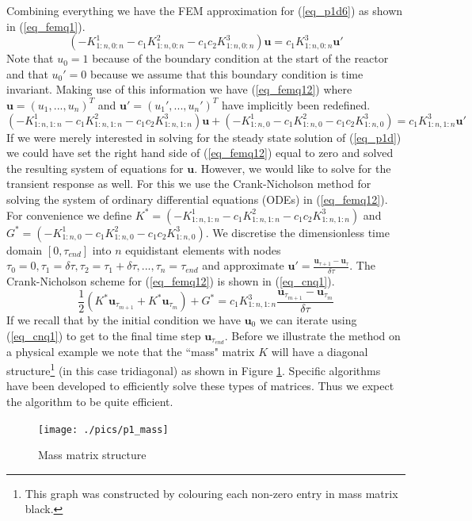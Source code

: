 \documentclass[11pt,fleqn]{article}
\theoremstyle{defstyle}
\begin{document}
Combining everything we have the FEM approximation for (\ref{eq_p1d6}) as shown in (\ref{eq_femq1}). 
\begin{equation}
\left(-K^1_{1:n,0:n}-c_1K^2_{1:n,0:n}-c_1c_2K^3_{1:n,0:n} \right)\mathbf{u} =  c_1K^3_{1:n,0:n}\mathbf{u}\prime
\label{eq_femq1}
\end{equation}
Note that $u_0=1$ because of the boundary condition at the start of the reactor and that $u_0\prime=0$ because we assume that this boundary condition is time invariant. Making use of this information we have (\ref{eq_femq12}) where $\mathbf{u}=\left(u_1,...,u_n\right)^T$ and $\mathbf{u}\prime=\left(u_1\prime,...,u_n\prime \right)^T$ have implicitly been redefined.
\begin{equation}
\left(-K^1_{1:n,1:n}-c_1K^2_{1:n,1:n}-c_1c_2K^3_{1:n,1:n} \right)\mathbf{u} +\left(-K^1_{1:n,0}-c_1K^2_{1:n,0} -c_1c_2K^3_{1:n,0}\right) =  c_1K^3_{1:n,1:n}\mathbf{u}\prime
\label{eq_femq12}
\end{equation}
If we were merely interested in solving for the steady state solution of (\ref{eq_p1d}) we could have set the right hand side of (\ref{eq_femq12}) equal to zero and solved the resulting system of equations for $\mathbf{u}$. However, we would like to solve for the transient response as well. For this we use the Crank-Nicholson method for solving the system of ordinary differential equations (ODEs) in (\ref{eq_femq12}). For convenience we define $K^* = \left(-K^1_{1:n,1:n}-c_1K^2_{1:n,1:n}-c_1c_2K^3_{1:n,1:n} \right)$ and $G^{*} = \left(-K^1_{1:n,0}-c_1K^2_{1:n,0} -c_1c_2K^3_{1:n,0}\right)$. We discretise the dimensionless time domain $[0,\tau_{end}]$ into $n$ equidistant elements with nodes $\tau_0 = 0, \tau_1=\delta \tau, \tau_2=\tau_1 + \delta \tau,...,\tau_n=\tau_{end}$ and approximate $\mathbf{u}\prime = \frac{\mathbf{u}_{\tau+1} -\mathbf{u}_{\tau}}{\delta \tau}$. The Crank-Nicholson scheme for (\ref{eq_femq12}) is shown in (\ref{eq_cnq1}).
\begin{equation}
\frac{1}{2}\left( K^*\mathbf{u}_{\tau_{m+1}} + K^*\mathbf{u}_{\tau_m} \right) + G^* = c_1K^3_{1:n,1:n}\frac{\mathbf{u}_{\tau_{m+1}} -\mathbf{u}_{\tau_{m}}}{\delta \tau}
\label{eq_cnq1}
\end{equation} 
If we recall that by the initial condition we have $\mathbf{u}_0$ we can iterate using (\ref{eq_cnq1}) to get to the final time step $\mathbf{u}_{\tau_{end}}$. Before we illustrate the method on a physical example we note that the ``mass" matrix $K$ will have a diagonal structure\footnote{This graph was constructed by colouring each non-zero entry in mass matrix black.} (in this case tridiagonal) as shown in Figure \ref{fig_p1mass}. Specific algorithms have been developed to efficiently solve these types of matrices. Thus we expect the algorithm to be quite efficient. 
\begin{figure}[H] 
\centering
\texttt{[image: ./pics/p1\_mass]}
\caption{Mass matrix structure} 
\label{fig_p1mass}
\end{figure}
\end{document}
